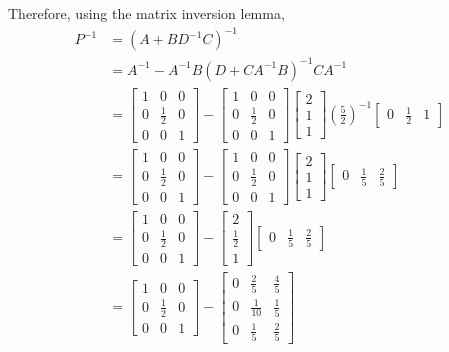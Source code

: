 Therefore, using the matrix inversion lemma,
\begin{align*}
	P^{-1} &= (A+BD^{-1}C)^{-1}\\
	&= A^{-1}-A^{-1}B(D+CA^{-1}B)^{-1}CA^{-1}\\
	&= \begin{bmatrix}1 & 0 & 0\\0 & \frac{1}{2} & 0\\0 & 0 & 1\end{bmatrix}-\begin{bmatrix}1 & 0 & 0\\0 & \frac{1}{2} & 0\\0 & 0 & 1\end{bmatrix}\begin{bmatrix}2\\1\\1\end{bmatrix}\left(\frac{5}{2}\right)^{-1}\begin{bmatrix}0 & \frac{1}{2} & 1\end{bmatrix}\\
	&= \begin{bmatrix}1 & 0 & 0\\0 & \frac{1}{2} & 0\\0 & 0 & 1\end{bmatrix}-\begin{bmatrix}1 & 0 & 0\\0 & \frac{1}{2} & 0\\0 & 0 & 1\end{bmatrix}\begin{bmatrix}2\\1\\1\end{bmatrix}\begin{bmatrix}0 & \frac{1}{5} & \frac{2}{5}\end{bmatrix}\\
	&= \begin{bmatrix}1 & 0 & 0\\0 & \frac{1}{2} & 0\\0 & 0 & 1\end{bmatrix}-\begin{bmatrix}2\\\frac{1}{2}\\1\end{bmatrix}\begin{bmatrix}0 & \frac{1}{5} & \frac{2}{5}\end{bmatrix}\\
	&= \begin{bmatrix}1 & 0 & 0\\0 & \frac{1}{2} & 0\\0 & 0 & 1\end{bmatrix}-\begin{bmatrix}0 & \frac{2}{5} & \frac{4}{5}\\0 & \frac{1}{10} & \frac{1}{5}\\0 & \frac{1}{5} & \frac{2}{5}\end{bmatrix}\\

\end{align*}

